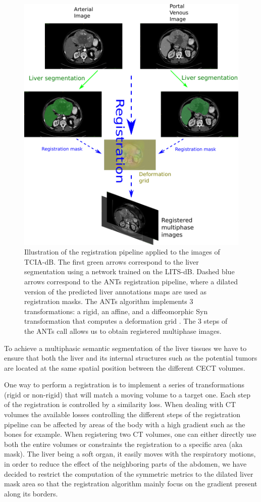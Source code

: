\documentclass[]{article}
\newcommand{\lmttfont}[1]{{\fontfamily{lmtt}\selectfont #1}}
\begin{document}
\begin{figure}[th!]
\centering
\includegraphics[width=0.7\linewidth]{images/RegistrationTCIA_pipeline_vertical2}
\caption{Illustration of the registration pipeline applied to the images of \lmttfont{TCIA-dB}. The first green arrows correspond to the liver segmentation using a network trained on the \lmttfont{LITS-dB}. Dashed blue arrows correspond to the ANTs registration pipeline, where a dilated version of the predicted liver annotations maps are used as registration masks. The ANTs algorithm implements 3 transformations: a rigid, an affine, and a diffeomorphic Syn transformation that computes a deformation grid \cite{Avants2008}. The 3 steps of the ANTs call allows us to obtain registered multiphase images.}
\label{fig:RegistrationTCIA_pipeline_vertical2}
\end{figure}


To achieve a multiphasic semantic segmentation of the liver tissues we
have to ensure that both the liver and its internal structures such as
the potential tumors are located at the same spatial position between
the different CECT volumes.

One way to perform a registration is to implement a series of
transformations (rigid or non-rigid) that will match a moving volume to
a target one. Each step of the registration is controlled by a
similarity loss.
When dealing with CT volumes the available losses controlling the
different steps of the registration pipeline can be affected by areas of
the body with a high gradient such as the bones for example. When
registering two CT volumes, one can either directly use both the entire
volumes or constraints the registration to a specific area (aka mask).
The liver being a soft organ, it easily moves with the respiratory
motions, in order to reduce the effect of the neighboring parts of the
abdomen, we have decided to restrict the computation of the symmetric
metrics to the dilated liver mask area so that the registration
algorithm mainly focus on the gradient present along its borders.
\end{document}
